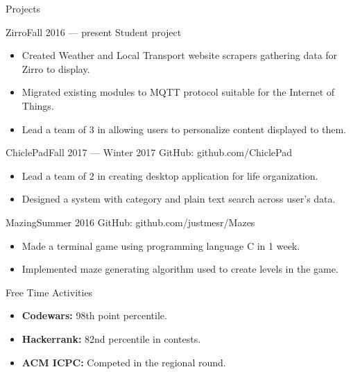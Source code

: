 \documentclass[]{mcdowellcv}
\begin{document}
	\begin{cvsection}{Projects}
		\begin{cvsubsection}{Zirro}{}{Fall 2016 — present}
			Student project
			\begin{itemize}
				\item Created Weather and Local Transport website scrapers gathering data for Zirro to display.
				\item Migrated existing modules to MQTT protocol suitable for the Internet of Things.
				\item Lead a team of 3 in allowing users to personalize content displayed to them.
			\end{itemize}
		\end{cvsubsection}

		\begin{cvsubsection}{ChiclePad}{}{Fall 2017 — Winter 2017}
			GitHub: github.com/ChiclePad
			\begin{itemize}
				\item Lead a team of 2 in creating desktop application for life organization.
				\item Designed a system with category and plain text search across user's data.
			\end{itemize}
		\end{cvsubsection}

		\begin{cvsubsection}{Mazing}{}{Summer 2016}
			GitHub: github.com/justmesr/Mazes
			\begin{itemize}
				\item Made a terminal game using programming language C in 1 week.
				\item Implemented maze generating algorithm used to create levels in the game. 
			\end{itemize}
		\end{cvsubsection}
	\end{cvsection}
	
	\begin{cvsection}{Free Time Activities}
		\begin{cvsubsection}{}{}{}	
			\begin{itemize}
				\item \textbf{Codewars:} 98th point percentile.
				\item \textbf{Hackerrank:} 82nd percentile in contests.
                \item \textbf{ACM ICPC:} Competed in the regional round.
			\end{itemize}
		\end{cvsubsection}
	\end{cvsection}
	
\end{document}

